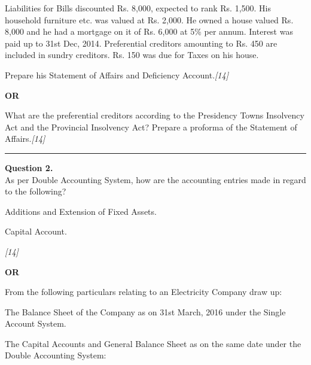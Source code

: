 \documentclass[11pt,a4paper]{article}
\newcommand{\pts}[1]{\hfill   \textit{[#1]}}
\begin{document}
Liabilities for Bills discounted Rs. 8,000, expected to rank Rs. 1,500. His household furniture etc. was valued at Rs. 2,000. He owned a house valued Rs. 8,000 and he had a mortgage on it of Rs. 6,000 at 5\% per annum. Interest was paid up to 31st Dec, 2014. Preferential creditors amounting to Rs. 450 are included in sundry creditors. Rs. 150 was due for Taxes on his house.

Prepare his Statement of Affairs and Deficiency Account.\pts{14}

\centerline{   \textbf{OR}}

What are the preferential creditors according to the Presidency Towns Insolvency Act and the Provincial Insolvency Act? Prepare a proforma of the Statement of Affairs.\pts{14}

\medskip\rule{\linewidth}{0.2pt}

\pagebreak




\noindent   \textbf{Question 2.} \\
As per Double Accounting System, how are the accounting entries made in regard to the following?

\begin{parts}
  \item Additions and Extension of Fixed Assets.
  \item Capital Account.
\end{parts}\pts{14}

\centerline{   \textbf{OR}}

From the following particulars relating to an Electricity Company draw up:

\begin{parts}
  \item The Balance Sheet of the Company as on 31st March, 2016 under the Single Account System.
  \item The Capital Accounts and General Balance Sheet as on the same date under the Double Accounting System:
\end{parts}
\end{document}
